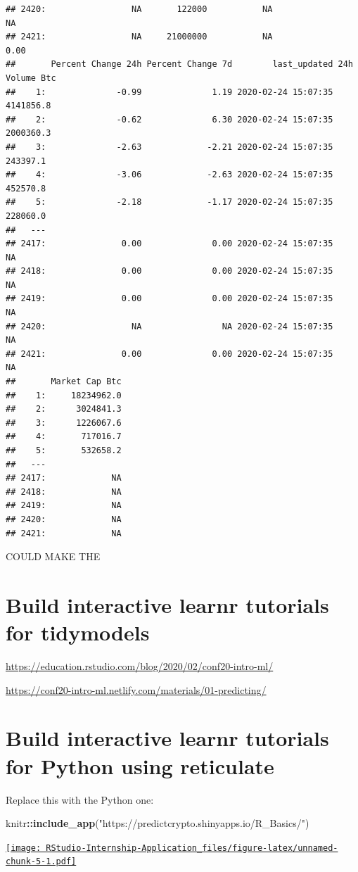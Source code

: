 \documentclass[
]{book}
\newenvironment{Shaded}{\begin{snugshade}}{\end{snugshade}}
\newcommand{\KeywordTok}[1]{\textcolor[rgb]{0.13,0.29,0.53}{\textbf{#1}}}
\newcommand{\NormalTok}[1]{#1}
\newcommand{\OperatorTok}[1]{\textcolor[rgb]{0.81,0.36,0.00}{\textbf{#1}}}
\newcommand{\StringTok}[1]{\textcolor[rgb]{0.31,0.60,0.02}{#1}}
\begin{document}
\begin{verbatim}
## 2420:                 NA       122000           NA                NA
## 2421:                 NA     21000000           NA              0.00
##       Percent Change 24h Percent Change 7d        last_updated 24h Volume Btc
##    1:              -0.99              1.19 2020-02-24 15:07:35      4141856.8
##    2:              -0.62              6.30 2020-02-24 15:07:35      2000360.3
##    3:              -2.63             -2.21 2020-02-24 15:07:35       243397.1
##    4:              -3.06             -2.63 2020-02-24 15:07:35       452570.8
##    5:              -2.18             -1.17 2020-02-24 15:07:35       228060.0
##   ---                                                                        
## 2417:               0.00              0.00 2020-02-24 15:07:35             NA
## 2418:               0.00              0.00 2020-02-24 15:07:35             NA
## 2419:               0.00              0.00 2020-02-24 15:07:35             NA
## 2420:                 NA                NA 2020-02-24 15:07:35             NA
## 2421:               0.00              0.00 2020-02-24 15:07:35             NA
##       Market Cap Btc
##    1:     18234962.0
##    2:      3024841.3
##    3:      1226067.6
##    4:       717016.7
##    5:       532658.2
##   ---               
## 2417:             NA
## 2418:             NA
## 2419:             NA
## 2420:             NA
## 2421:             NA
\end{verbatim}

COULD MAKE THE

\hypertarget{build-interactive-learnr-tutorials-for-tidymodels}{%
\section{Build interactive learnr tutorials for tidymodels}\label{build-interactive-learnr-tutorials-for-tidymodels}}

\url{https://education.rstudio.com/blog/2020/02/conf20-intro-ml/}

\url{https://conf20-intro-ml.netlify.com/materials/01-predicting/}

\hypertarget{build-interactive-learnr-tutorials-for-python-using-reticulate}{%
\section{Build interactive learnr tutorials for Python using reticulate}\label{build-interactive-learnr-tutorials-for-python-using-reticulate}}

Replace this with the Python one:

\begin{Shaded}
\begin{Highlighting}[]
\NormalTok{knitr}\OperatorTok{::}\KeywordTok{include_app}\NormalTok{(}\StringTok{"https://predictcrypto.shinyapps.io/R_Basics/"}\NormalTok{)}
\end{Highlighting}
\end{Shaded}

\href{https://predictcrypto.shinyapps.io/R_Basics/}{\texttt{[image: RStudio-Internship-Application\_files/figure-latex/unnamed-chunk-5-1.pdf]}}

  
\end{document}
